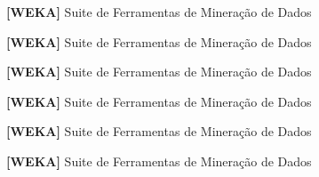 \begin{ListaSiglas}

\begin{siglas}
  \item \textbf{[WEKA]} Suite de Ferramentas de Mineração de Dados
  \item \textbf{[WEKA]} Suite de Ferramentas de Mineração de Dados
  \item \textbf{[WEKA]} Suite de Ferramentas de Mineração de Dados
  \item \textbf{[WEKA]} Suite de Ferramentas de Mineração de Dados
  \item \textbf{[WEKA]} Suite de Ferramentas de Mineração de Dados
  \item \textbf{[WEKA]} Suite de Ferramentas de Mineração de Dados
\end{siglas}

\end{ListaSiglas}


